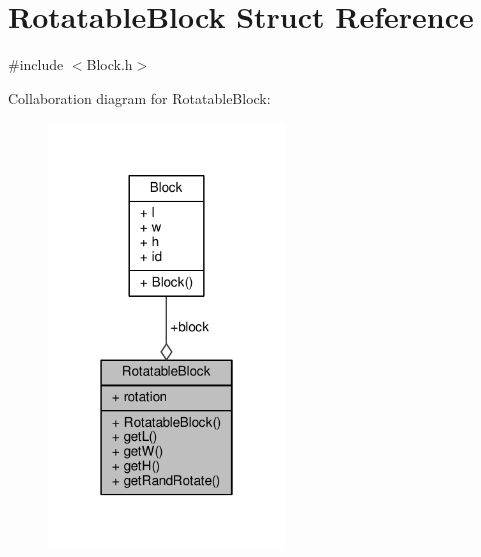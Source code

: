 \hypertarget{structRotatableBlock}{}\section{Rotatable\+Block Struct Reference}
\label{structRotatableBlock}


{\ttfamily \#include $<$Block.\+h$>$}



Collaboration diagram for Rotatable\+Block\+:
\nopagebreak
\begin{figure}[H]
\begin{center}
\leavevmode
\includegraphics[width=178pt]{structRotatableBlock__coll__graph}
\end{center}
\end{figure}
